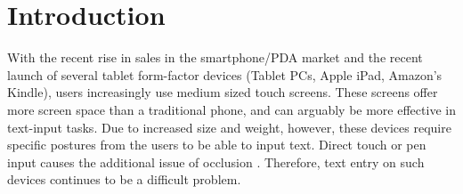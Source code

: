 \section{Introduction}

With the recent rise in sales in the smartphone/PDA market
and the recent launch of several tablet form-factor devices (Tablet PCs, Apple iPad, Amazon's Kindle), users increasingly use medium sized touch screens. These screens offer
more screen space than a traditional phone, and can arguably be more
effective in text-input tasks. Due to increased size and weight,
however, these devices require specific postures from the users to be
able to input text. Direct touch or pen input causes the additional issue of occlusion . Therefore, text entry on such devices continues to be a difficult problem.

